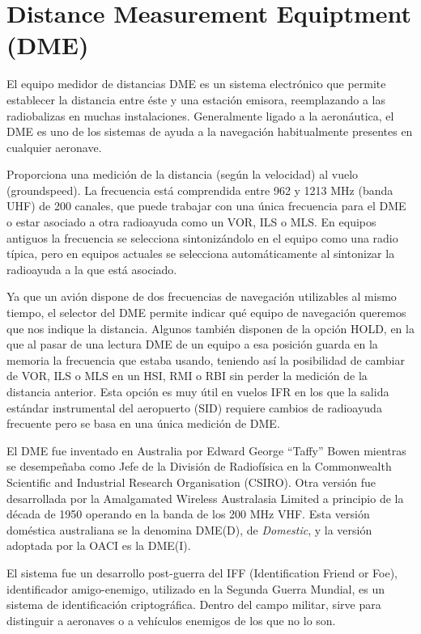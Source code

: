   
\section{Distance Measurement Equiptment (DME)}
\label{sec:U06.04.DME}

El equipo medidor de distancias %
\ac{DME}
 es un sistema electr\'onico que permite establecer la distancia entre \'este y una estaci\'on emisora, reemplazando a las radiobalizas en muchas instalaciones. Generalmente ligado a la aeron\'autica, el DME es uno de los sistemas de ayuda a la navegaci\'on habitualmente presentes en cualquier aeronave.

Proporciona una medici\'on de la distancia (seg\'un la velocidad) al vuelo (groundspeed). La frecuencia est\'a comprendida entre 962 y 1213 MHz (banda UHF) de 200 canales, que puede trabajar con una \'unica frecuencia para el DME o estar asociado a otra radioayuda como un VOR, ILS o MLS. En equipos antiguos la frecuencia se selecciona sintoniz\'andolo en el equipo como una radio t\'ipica, pero en equipos actuales se selecciona autom\'aticamente al sintonizar la radioayuda a la que est\'a asociado.

Ya que un avi\'on dispone de dos frecuencias de navegaci\'on utilizables al mismo tiempo, el selector del DME permite indicar qu\'e equipo de navegaci\'on queremos que nos indique la distancia. Algunos tambi\'en disponen de la opci\'on HOLD, en la que al pasar de una lectura DME de un equipo a esa posici\'on guarda en la memoria la frecuencia que estaba usando, teniendo as\'i la posibilidad de cambiar de VOR, ILS o MLS en un HSI, RMI o RBI sin perder la medici\'on de la distancia anterior. Esta opci\'on es muy \'util en vuelos IFR en los que la salida est\'andar instrumental del aeropuerto (SID) requiere cambios de radioayuda frecuente pero se basa en una \'unica medici\'on de DME.

El \ac{DME} fue inventado en Australia por  Edward George ``Taffy'' Bowen mientras se desempe\~naba como Jefe de la Divisi\'on de Radiof\'isica en la  Commonwealth Scientific and Industrial Research Organisation (CSIRO). Otra versi\'on fue desarrollada por la Amalgamated Wireless Australasia Limited a principio de la d\'ecada de 1950 operando en la banda de los 200 MHz VHF. Esta versi\'on dom\'estica australiana se la denomina DME(D), de \emph{Domestic}, y la versi\'on adoptada por la OACI es la DME(I).

El sistema fue un desarrollo post-guerra del IFF (Identification Friend or Foe), identificador amigo-enemigo, utilizado en la Segunda Guerra Mundial, es un sistema de identificaci\'on criptogr\'afica. Dentro del campo militar, sirve para distinguir a aeronaves o a veh\'iculos enemigos de los que no lo son.

